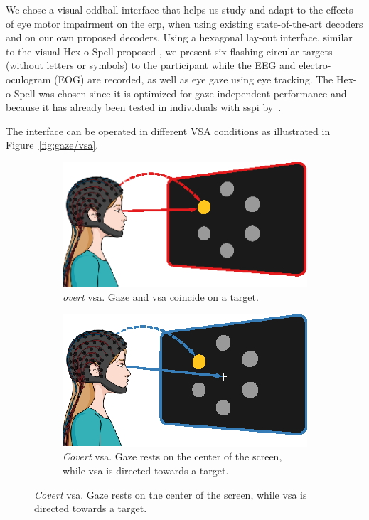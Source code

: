 We chose a visual oddball interface that helps us study and adapt
to the effects of eye motor impairment on the \ac{erp}, when using existing state-of-the-art
decoders and on our own proposed decoders.
Using a hexagonal lay-out interface, similar to the visual Hex-o-Spell proposed
\textcite{Treder2010}, we present six flashing circular targets
(without letters or symbols) to the participant while the EEG and
electro-oculogram (EOG) are recorded, as well as eye gaze using eye tracking.
The Hex-o-Spell was chosen since it is optimized for gaze-independent
performance and because it has already been tested in individuals with
\ac{sspi} by~\textcite{Severens2014}.

The interface can be operated in different VSA conditions as illustrated in
Figure~\ref{fig:gaze/vsa}.

\begin{figure}
  \begin{subfigure}[t]{.45\textwidth}
    \includegraphics[width=\textwidth]{figures/gaze_independence/attention_overt.eps}
    \caption[Overt \ac{vsa}]{%
      \emph{overt} \ac{vsa}.
      Gaze and \ac{vsa} coincide on a target.
    }
    \label{fig:gaze/vsa/overt}
  \end{subfigure}\hfill%
  \begin{subfigure}[t]{.45\textwidth}
    \includegraphics[width=\textwidth]{figures/gaze_independence/attention_covert.eps}
    \caption[Covert \ac{vsa}]{%
      \emph{Covert} \ac{vsa}.
      Gaze rests on the center of the screen, while \ac{vsa} is directed towards a target.
    }
    \label{fig:gaze/vsa/covert}
  \end{subfigure}


\end{figure}
